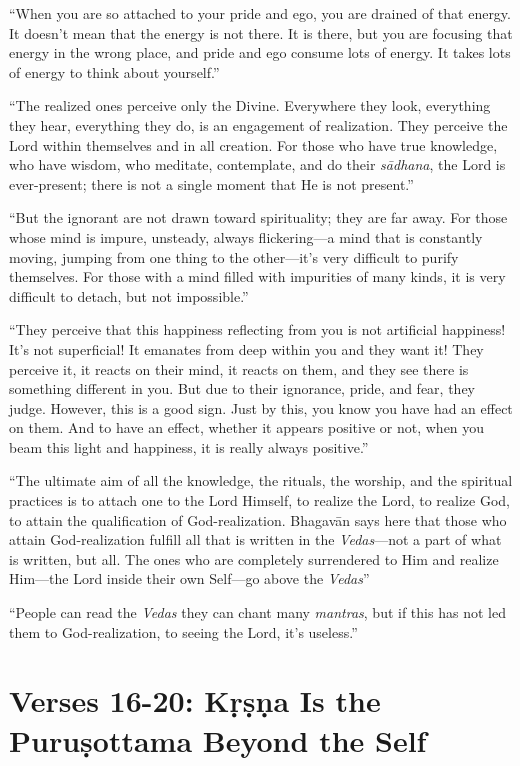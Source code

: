 \enquote{When you are so attached to your pride and ego, you are drained of that energy. It doesn’t mean that the energy is not there. It is there, but you are focusing that energy in the wrong place, and pride and ego consume lots of energy. It takes lots of energy to think about yourself.}

\enquote{The realized ones perceive only the Divine. Everywhere they look, everything they hear, everything they do, is an engagement of realization. They perceive the Lord within themselves and in all creation. For those who have true knowledge, who have wisdom, who meditate, contemplate, and do their \textit{sādhana}, the Lord is ever-present; there is not a single moment that He is not present.}

\enquote{But the ignorant are not drawn toward spirituality; they are far away. For those whose mind is impure, unsteady, always flickering---a mind that is constantly moving, jumping from one thing to the other---it’s very difficult to purify themselves. For those with a mind filled with impurities of many kinds, it is very difficult to detach, but not impossible.}

\enquote{They perceive that this happiness reflecting from you is not artificial happiness! It’s not superficial! It emanates from deep within you and they want it! They perceive it, it reacts on their mind, it reacts on them, and they see there is something different in you. But due to their ignorance, pride, and fear, they judge. However, this is a good sign. Just by this, you know you have had an effect on them. And to have an effect, whether it appears positive or not, when you beam this light and happiness, it is really always positive.}

\enquote{The ultimate aim of all the knowledge, the rituals, the worship, and the spiritual practices is to attach one to the Lord Himself, to realize the Lord, to realize God, to attain the qualification of God-realization. Bhagavān says here that those who attain God-realization fulfill all that is written in the \textit{Vedas}---not a part of what is written, but all. The ones who are completely surrendered to Him and realize Him---the Lord inside their own Self---go above the \textit{Vedas}}

\enquote{People can read the \textit{Vedas} they can chant many \textit{mantras}, but if this has not led them to God-realization, to seeing the Lord, it’s useless.}

\section{Verses 16-20: Kṛṣṇa Is the Puruṣottama Beyond the Self}\label{sec-verses-16-20-krsna-is-the-purusottama-beyond-the-self}



